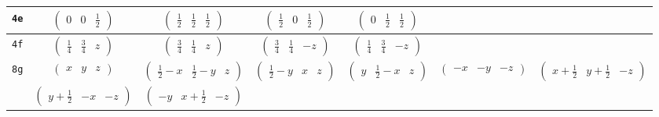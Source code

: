\documentclass[fleqn,9pt,landscape]{jsarticle}
\begin{document}
\begin{center}
\begin{longtable}{ccccccc}
{\tt 4e} & $ \begin{pmatrix} 0 & 0 & \frac{1}{2} \end{pmatrix} $ & $ \begin{pmatrix} \frac{1}{2} & \frac{1}{2} & \frac{1}{2} \end{pmatrix} $ & $ \begin{pmatrix} \frac{1}{2} & 0 & \frac{1}{2} \end{pmatrix} $ & $ \begin{pmatrix} 0 & \frac{1}{2} & \frac{1}{2} \end{pmatrix} $ & $  $ & $  $ \\ \hline
{\tt 4f} & $ \begin{pmatrix} \frac{1}{4} & \frac{3}{4} & z \end{pmatrix} $ & $ \begin{pmatrix} \frac{3}{4} & \frac{1}{4} & z \end{pmatrix} $ & $ \begin{pmatrix} \frac{3}{4} & \frac{1}{4} & - z \end{pmatrix} $ & $ \begin{pmatrix} \frac{1}{4} & \frac{3}{4} & - z \end{pmatrix} $ & $  $ & $  $ \\ \hline
{\tt 8g} & $ \begin{pmatrix} x & y & z \end{pmatrix} $ & $ \begin{pmatrix} \frac{1}{2} - x & \frac{1}{2} - y & z \end{pmatrix} $ & $ \begin{pmatrix} \frac{1}{2} - y & x & z \end{pmatrix} $ & $ \begin{pmatrix} y & \frac{1}{2} - x & z \end{pmatrix} $ & $ \begin{pmatrix} - x & - y & - z \end{pmatrix} $ & $ \begin{pmatrix} x + \frac{1}{2} & y + \frac{1}{2} & - z \end{pmatrix} $ \\
& $ \begin{pmatrix} y + \frac{1}{2} & - x & - z \end{pmatrix} $ & $ \begin{pmatrix} - y & x + \frac{1}{2} & - z \end{pmatrix} $ & $  $ & $  $ & $  $ & $  $ \\
\end{longtable}
\end{center}
\end{document}
